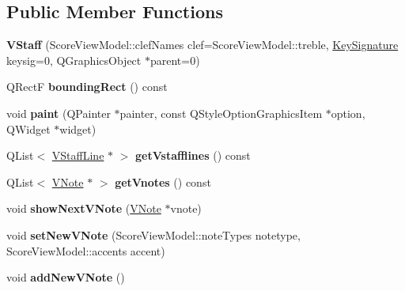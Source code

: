 \subsection*{Public Member Functions}
\begin{DoxyCompactItemize}
\item 
\hypertarget{class_v_staff_af020580c558ab24a9af2bccbab36ec33}{}{\bfseries V\+Staff} (Score\+View\+Model\+::clef\+Names clef=Score\+View\+Model\+::treble, \hyperlink{class_key_signature}{Key\+Signature} keysig=0, Q\+Graphics\+Object $\ast$parent=0)\label{class_v_staff_af020580c558ab24a9af2bccbab36ec33}

\item 
\hypertarget{class_v_staff_ade19faa451d9ce058cddcafeacb5a432}{}Q\+Rect\+F {\bfseries bounding\+Rect} () const \label{class_v_staff_ade19faa451d9ce058cddcafeacb5a432}

\item 
\hypertarget{class_v_staff_aeefc796be13d05ddc8bfee7ff49ee5b6}{}void {\bfseries paint} (Q\+Painter $\ast$painter, const Q\+Style\+Option\+Graphics\+Item $\ast$option, Q\+Widget $\ast$widget)\label{class_v_staff_aeefc796be13d05ddc8bfee7ff49ee5b6}

\item 
\hypertarget{class_v_staff_af6260222d1f6c5af860edeee4e5ad2e2}{}Q\+List$<$ \hyperlink{class_v_staff_line}{V\+Staff\+Line} $\ast$ $>$ {\bfseries get\+Vstafflines} () const \label{class_v_staff_af6260222d1f6c5af860edeee4e5ad2e2}

\item 
\hypertarget{class_v_staff_a37e2606c7ff7e487059337274c706c2b}{}Q\+List$<$ \hyperlink{class_v_note}{V\+Note} $\ast$ $>$ {\bfseries get\+Vnotes} () const \label{class_v_staff_a37e2606c7ff7e487059337274c706c2b}

\item 
\hypertarget{class_v_staff_af0e303b975eb997e6e11bd7696bf8ead}{}void {\bfseries show\+Next\+V\+Note} (\hyperlink{class_v_note}{V\+Note} $\ast$vnote)\label{class_v_staff_af0e303b975eb997e6e11bd7696bf8ead}

\item 
\hypertarget{class_v_staff_a7ca9cc1d027b2796047aff5020fa195b}{}void {\bfseries set\+New\+V\+Note} (Score\+View\+Model\+::note\+Types notetype, Score\+View\+Model\+::accents accent)\label{class_v_staff_a7ca9cc1d027b2796047aff5020fa195b}

\item 
\hypertarget{class_v_staff_a5560aebaca63c903d6514674a090716a}{}void {\bfseries add\+New\+V\+Note} ()\label{class_v_staff_a5560aebaca63c903d6514674a090716a}


\end{DoxyCompactItemize}

